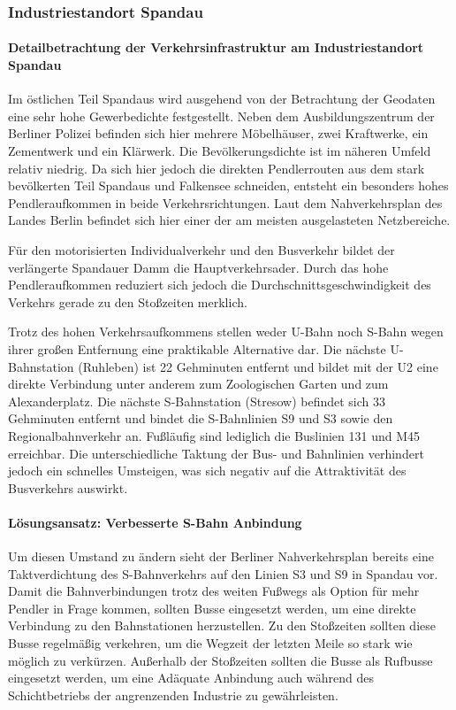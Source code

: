 \subsubsection{Industriestandort Spandau}
\paragraph{Detailbetrachtung der Verkehrsinfrastruktur am Industriestandort Spandau}
Im östlichen Teil Spandaus wird ausgehend von der Betrachtung der Geodaten eine sehr hohe Gewerbedichte festgestellt. Neben dem Ausbildungszentrum der Berliner Polizei befinden sich hier mehrere Möbelhäuser, zwei Kraftwerke, ein Zementwerk und ein Klärwerk. Die Bevölkerungsdichte ist im näheren Umfeld relativ niedrig. Da sich hier jedoch die direkten Pendlerrouten aus dem stark bevölkerten Teil Spandaus und Falkensee schneiden, entsteht ein besonders hohes Pendleraufkommen in beide Verkehrsrichtungen. Laut dem Nahverkehrsplan des Landes Berlin befindet sich hier einer der am meisten ausgelasteten Netzbereiche.


Für den motorisierten Individualverkehr und den Busverkehr bildet der verlängerte Spandauer Damm die Hauptverkehrsader. Durch das hohe Pendleraufkommen reduziert sich jedoch die Durchschnittsgeschwindigkeit des Verkehrs gerade zu den Stoßzeiten merklich.

Trotz des hohen Verkehrsaufkommens stellen weder U-Bahn noch S-Bahn wegen ihrer großen Entfernung eine praktikable Alternative dar. Die nächste U-Bahnstation (Ruhleben) ist 22 Gehminuten entfernt und bildet mit der U2 eine direkte Verbindung unter anderem zum Zoologischen Garten und zum Alexanderplatz. Die nächste S-Bahnstation (Stresow) befindet sich 33 Gehminuten entfernt und bindet die S-Bahnlinien S9 und S3 sowie den Regionalbahnverkehr an. Fußläufig sind lediglich die Buslinien 131 und M45 erreichbar. Die unterschiedliche Taktung der Bus- und Bahnlinien verhindert jedoch ein schnelles Umsteigen, was sich negativ auf die Attraktivität des Busverkehrs auswirkt.

\paragraph{Lösungsansatz: Verbesserte S-Bahn Anbindung}
Um diesen Umstand zu ändern sieht der Berliner Nahverkehrsplan bereits eine Taktverdichtung des S-Bahnverkehrs auf den Linien S3 und S9 in Spandau vor. Damit die Bahnverbindungen trotz des weiten Fußwegs als Option für mehr Pendler in Frage kommen, sollten Busse eingesetzt werden, um eine direkte Verbindung zu den Bahnstationen herzustellen. Zu den Stoßzeiten sollten diese Busse regelmäßig verkehren, um die Wegzeit der letzten Meile so stark wie möglich zu verkürzen. Außerhalb der Stoßzeiten sollten die Busse als Rufbusse eingesetzt werden, um eine Adäquate Anbindung auch während des Schichtbetriebs der angrenzenden Industrie zu gewährleisten.

